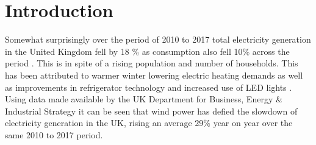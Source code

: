 \documentclass[11pt]{article}
\begin{document}


\clearpage
{}
\section{Introduction}

Somewhat surprisingly over the period of 2010 to 2017 total electricity generation in the United Kingdom fell by 18 \% \cite{data1} as consumption also fell 10\% across the period \cite{data2}. This is in spite of a rising population and number of households. This has been attributed to warmer winter lowering electric heating demands as well as improvements in refrigerator technology and increased use of LED lights \cite{guardian}. Using data made available by the UK Department for Business, Energy \& Industrial Strategy \cite{data1} it can be seen that wind power has defied the slowdown of electricity generation in the UK, rising an average 29\% year on year over the same 2010 to 2017 period. 
\end{document}
